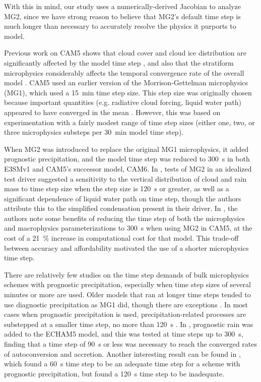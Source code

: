 \documentclass [11pt, proquest] {uwthesis}[2020/02/24]
\begin{document}
With this in mind, our study uses a numerically-derived Jacobian to analyze MG2, since we have strong reason to believe that MG2's default time step is much longer than necessary to accurately resolve the physics it purports to model.

Previous work on CAM5 shows that cloud cover and cloud ice distribution are significantly affected by the model time step \parencite{Wan2014}, and also that the stratiform microphysics considerably affects the temporal convergence rate of the overall model \parencite{Wan2015}. CAM5 used an earlier version of the Morrison-Gettelman microphysics (MG1), which used a \SI{15}{\minute} time step size. This step size was originally chosen because important quantities (e.g. radiative cloud forcing, liquid water path) appeared to have converged in the mean \parencite{Gettelman2008}. However, this was based on experimentation with a fairly modest range of time step sizes (either one, two, or three microphysics substeps per \SI{30}{\minute} model time step).

When MG2 was introduced to replace the original MG1 microphysics, it added prognostic precipitation, and the model time step was reduced to \SI{300}{\second} in both E3SMv1 and CAM5’s successor model, CAM6. In \textcite{Gettelman2015-pI}, tests of MG2 in an idealized test driver suggested a sensitivity to the vertical distribution of cloud and rain mass to time step size when the step size is \SI{120}{\second} or greater, as well as a significant dependence of liquid water path on time step, though the authors attribute this to the simplified condensation present in their driver. In \textcite{Gettelman2015-pII}, the authors note some benefits of reducing the time step of both the microphysics and macrophysics parameterizations to \SI{300}{\second} when using MG2 in CAM5, at the cost of a \SI{21}{\percent} increase in computational cost for that model. This trade-off between accuracy and affordability motivated the use of a shorter microphysics time step.

There are relatively few studies on the time step demands of bulk microphysics schemes with prognostic precipitation, especially when time step sizes of several minutes or more are used. Older models that ran at longer time steps tended to use diagnostic precipitation as MG1 did, though there are exceptions \parencite{Lopez2002}. In most cases when prognostic precipitation is used, precipitation-related processes are substepped at a smaller time step, no more than \SI{120}{\second} \parencite{Fowler1996,Sant2015,Michibata2019}. In \textcite{Posselt2008}, prognostic rain was added to the ECHAM5 model, and this was tested at time steps up to \SI{300}{\second}, finding that a time step of \SI{90}{\second} or less was necessary to reach the converged rates of autoconversion and accretion. Another interesting result can be found in \textcite{Chosson2014}, which found a \SI{60}{\second} time step to be an adequate time step for a scheme with prognostic precipitation, but found a \SI{120}{\second} time step to be inadequate.
\end{document}
